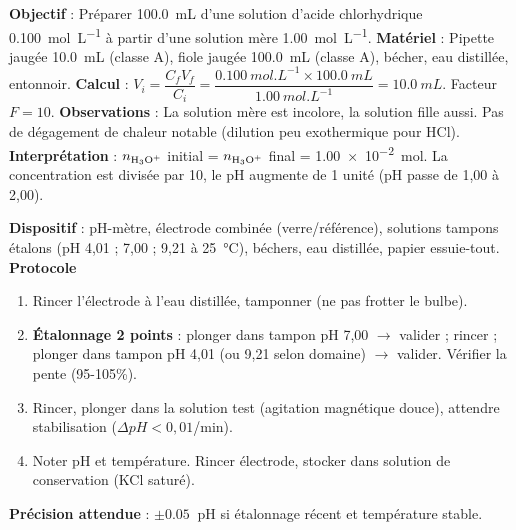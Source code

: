\documentclass[11pt]{article}
\begin{document}
\begin{experience}
\textbf{Objectif} : Préparer \SI{100,0}{mL} d'une solution d'acide chlorhydrique \SI{0,100}{mol.L^{-1}} à partir d'une solution mère \SI{1,00}{mol.L^{-1}}.
\textbf{Matériel} : Pipette jaugée \SI{10,0}{mL} (classe A), fiole jaugée \SI{100,0}{mL} (classe A), bécher, eau distillée, entonnoir.
\textbf{Calcul} : $V_i = \dfrac{C_f V_f}{C_i} = \dfrac{\SI{0,100}{mol.L^{-1}} \times \SI{100,0}{mL}}{\SI{1,00}{mol.L^{-1}}} = \SI{10,0}{mL}$. Facteur $F=10$.
\textbf{Observations} : La solution mère est incolore, la solution fille aussi. Pas de dégagement de chaleur notable (dilution peu exothermique pour HCl).
\textbf{Interprétation} : $n_{\ce{H3O+}}$ initial = $n_{\ce{H3O+}}$ final = \SI{1,00e-2}{mol}. La concentration est divisée par 10, le pH augmente de 1 unité (pH passe de 1,00 à 2,00).
\end{experience}

\begin{experience}
\textbf{Dispositif} : pH-mètre, électrode combinée (verre/référence), solutions tampons étalons (pH 4,01 ; 7,00 ; 9,21 à \SI{25}{\celsius}), béchers, eau distillée, papier essuie-tout.
\textbf{Protocole}
\begin{enumerate}
  \item Rincer l'électrode à l'eau distillée, tamponner (ne pas frotter le bulbe).
  \item \textbf{Étalonnage 2 points} : plonger dans tampon pH 7,00 $\rightarrow$ valider ; rincer ; plonger dans tampon pH 4,01 (ou 9,21 selon domaine) $\rightarrow$ valider. Vérifier la pente (95-105\%).
  \item Rincer, plonger dans la solution test (agitation magnétique douce), attendre stabilisation ($\Delta pH < 0,01$/min).
  \item Noter pH et température. Rincer électrode, stocker dans solution de conservation (KCl saturé).
\end{enumerate}
\textbf{Précision attendue} : $\pm \SI{0,05}{}$ pH si étalonnage récent et température stable.
\end{experience}
\end{document}
